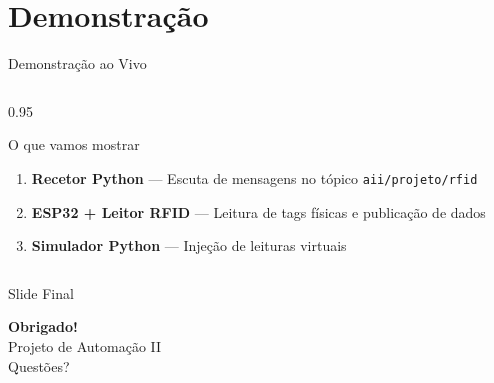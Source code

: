 \documentclass[aspectratio=169, 12pt]{beamer}
\begin{document}
  \section{Demonstra\c{c}\~{a}o}
  \begin{frame}{Demonstra\c{c}\~{a}o ao Vivo}
    \begin{columns}[T]
      \begin{column}{0.95\textwidth}
        \begin{block}{O que vamos mostrar}
          \begin{enumerate}
            \item \textbf{Recetor Python} --- Escuta de mensagens no t\'{o}pico \texttt{aii/projeto/rfid}
            \item \textbf{ESP32 + Leitor RFID} --- Leitura de tags f\'{i}sicas e publica\c{c}\~{a}o de dados
            \item \textbf{Simulador Python} --- Inje\c{c}\~{a}o de leituras virtuais
          \end{enumerate}
        \end{block}
        \vspace{0.4em}
      \end{column}
    \end{columns}
  \end{frame}

  \begin{frame}{Slide Final}
    \centering
    \vspace{1.8em}
    {\Huge\bfseries\color{white} Obrigado!}\\[1.0em]
    {\large\color{white!80} Projeto de Automa\c{c}\~{a}o II}\\[2.0em]
    \vspace{1.2em} 
    {\color{white!60}\small Quest\~{o}es?}
  \end{frame}

  
\end{document}
